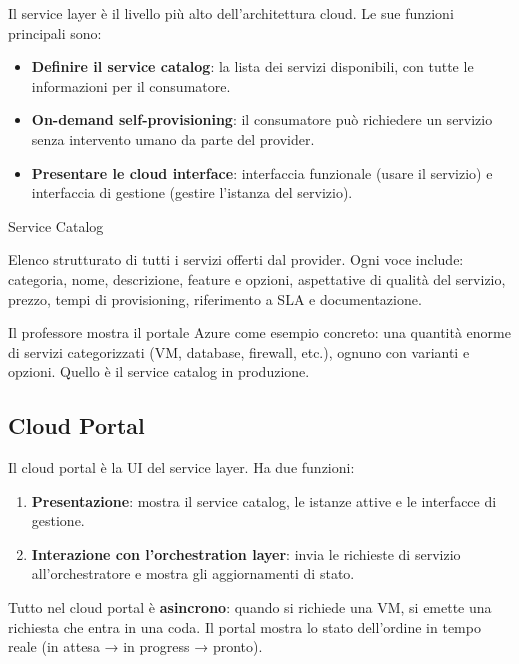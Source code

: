\documentclass[
  italian,
  openany]{book}
\providecommand{\tightlist}{%
  \setlength{\itemsep}{0pt}\setlength{\parskip}{0pt}}
\begin{document}
Il service layer è il livello più alto dell'architettura cloud. Le sue
funzioni principali sono:

\begin{itemize}
\tightlist
\item
  \textbf{Definire il service catalog}: la lista dei servizi
  disponibili, con tutte le informazioni per il consumatore.
\item
  \textbf{On-demand self-provisioning}: il consumatore può richiedere un
  servizio senza intervento umano da parte del provider.
\item
  \textbf{Presentare le cloud interface}: interfaccia funzionale (usare
  il servizio) e interfaccia di gestione (gestire l'istanza del
  servizio).
\end{itemize}

\begin{calloutdefinition}{Service Catalog}

Elenco strutturato di tutti i servizi offerti dal provider. Ogni voce
include: categoria, nome, descrizione, feature e opzioni, aspettative di
qualità del servizio, prezzo, tempi di provisioning, riferimento a SLA e
documentazione.

\end{calloutdefinition}

Il professore mostra il portale Azure come esempio concreto: una
quantità enorme di servizi categorizzati (VM, database, firewall, etc.),
ognuno con varianti e opzioni. Quello è il service catalog in
produzione.

\subsection{Cloud Portal}\label{cloud-portal}

Il cloud portal è la UI del service layer. Ha due funzioni:

\begin{enumerate}
\def\labelenumi{\arabic{enumi}.}
\tightlist
\item
  \textbf{Presentazione}: mostra il service catalog, le istanze attive e
  le interfacce di gestione.
\item
  \textbf{Interazione con l'orchestration layer}: invia le richieste di
  servizio all'orchestratore e mostra gli aggiornamenti di stato.
\end{enumerate}

Tutto nel cloud portal è \textbf{asincrono}: quando si richiede una VM,
si emette una richiesta che entra in una coda. Il portal mostra lo stato
dell'ordine in tempo reale (in attesa → in progress → pronto).
\end{document}
